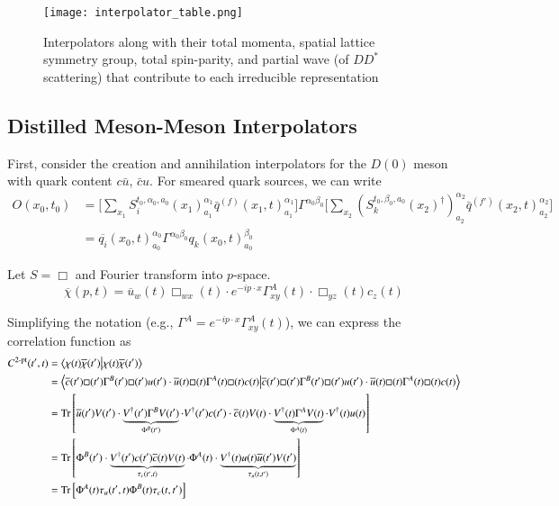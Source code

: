 \begin{figure}
\texttt{[image: interpolator\_table.png]}\
\caption{Interpolators along with their total momenta, spatial lattice symmetry group, total spin-parity, and partial wave (of $DD^*$ scattering) that contribute to each irreducible representation}
\end{figure}
\subsection{Distilled Meson-Meson Interpolators}
First, consider the creation and annihilation interpolators for the \(D(0)\) meson with quark content \(c\bar{u}\), \(\bar{c}u\). For smeared quark sources, we can write \cite{peardon_novel_2009} 
\begin{align}
    O(x_0,t_0) &= \Bigg[\sum_{x_1} S_i^{t_0,\alpha_0,a_0}(x_1)^{\alpha_1}_{a_1}\bar{q}^{(f)}(x_1,t)^{\alpha_1}_{a_1}\Bigg] \Gamma^{\alpha_0\beta_0} \Bigg[\sum_{x_2} (S_k^{t_0,\beta_0,a_0}(x_2)^\dagger)^{\alpha_2}_{a_2}\bar{q}^{(f')}(x_2,t)^{\alpha_2}_{a_2}\Bigg] \\
    &= \overline{q_i}(x_0, t)^{\alpha_0}_{a_0} \Gamma^{\alpha_0\beta_0} q_k(x_0,t)^{\beta_0}_{a_0}
\end{align}

Let \(S = \Box\) and Fourier transform into \(p\)-space. 
\[
\overline{\chi}(p, t) = \overline{u}_w(t) \Box_{wx}(t) \cdot e^{-ip\cdot x} \Gamma^A_{xy}(t) \cdot \Box_{yz}(t) c_z(t)
\]

Simplifying the notation (e.g., \(\Gamma^A = e^{-ip\cdot x} \Gamma^A_{xy}(t)\)), we can express the correlation function as 
\begin{align}
C^{2\text{-pt}}(t^\prime, t) &= \braket{\chi(t) \overline{\chi}(t^\prime)} \\
&= \braket{
\overline{c}(t^\prime) \Box(t^\prime) \Gamma^B(t^\prime) \Box(t^\prime) u(t^\prime) \cdot
\overline{u}(t) \Box(t) \Gamma^A(t) \Box(t) c(t)
} \\ 
&= \text{Tr}\left[
    \overline{u}(t^\prime) V(t^\prime) \cdot 
    \underbrace{V^\dagger(t^\prime) \Gamma^B V(t^\prime)}_{\Phi^B(t^\prime)} \cdot 
    V^\dagger(t^\prime) c(t^\prime) \cdot 
    \overline{c}(t) V(t) \cdot 
    \underbrace{V^\dagger(t) \Gamma^A V(t)}_{\Phi^A(t)} \cdot 
    V^\dagger(t) u(t)
\right] \\
&= \text{Tr} \left[\Phi^B(t^\prime) \cdot 
    \underbrace{V^\dagger(t^\prime) c(t^\prime) \overline{c}(t) V(t)}_{\tau_c(t^\prime, t)} \cdot 
    \Phi^A(t) \cdot 
    \underbrace{V^\dagger(t) u(t) \overline{u}(t^\prime) V(t^\prime)}_{\tau_u(t, t^\prime)}
\right] \\
&= \text{Tr}\left[\Phi^A(t) \tau_u(t^\prime, t) \Phi^B(t) \tau_c(t, t^\prime)\right]
\end{align}

